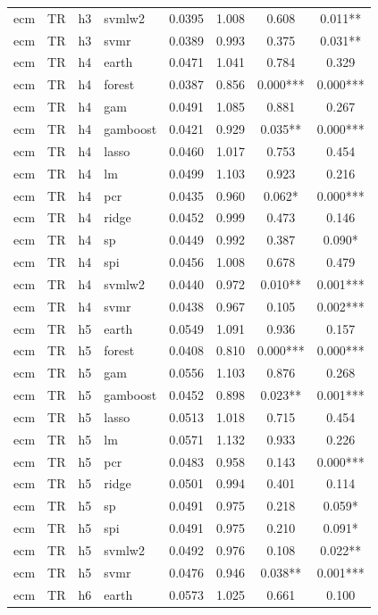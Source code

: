 \begin{ThreePartTable}
\begin{longtable}[t]{llclcccc}
ecm & TR & h3 & svmlw2 & 0.0395 & 1.008 & 0.608 & 0.011**\\
ecm & TR & h3 & svmr & 0.0389 & 0.993 & 0.375 & 0.031**\\
\addlinespace
ecm & TR & h4 & earth & 0.0471 & 1.041 & 0.784 & 0.329\\
ecm & TR & h4 & forest & 0.0387 & 0.856 & 0.000*** & 0.000***\\
ecm & TR & h4 & gam & 0.0491 & 1.085 & 0.881 & 0.267\\
ecm & TR & h4 & gamboost & 0.0421 & 0.929 & 0.035** & 0.000***\\
ecm & TR & h4 & lasso & 0.0460 & 1.017 & 0.753 & 0.454\\
ecm & TR & h4 & lm & 0.0499 & 1.103 & 0.923 & 0.216\\
ecm & TR & h4 & pcr & 0.0435 & 0.960 & 0.062* & 0.000***\\
ecm & TR & h4 & ridge & 0.0452 & 0.999 & 0.473 & 0.146\\
ecm & TR & h4 & sp & 0.0449 & 0.992 & 0.387 & 0.090*\\
ecm & TR & h4 & spi & 0.0456 & 1.008 & 0.678 & 0.479\\
ecm & TR & h4 & svmlw2 & 0.0440 & 0.972 & 0.010** & 0.001***\\
ecm & TR & h4 & svmr & 0.0438 & 0.967 & 0.105 & 0.002***\\
\addlinespace
ecm & TR & h5 & earth & 0.0549 & 1.091 & 0.936 & 0.157\\
ecm & TR & h5 & forest & 0.0408 & 0.810 & 0.000*** & 0.000***\\
ecm & TR & h5 & gam & 0.0556 & 1.103 & 0.876 & 0.268\\
ecm & TR & h5 & gamboost & 0.0452 & 0.898 & 0.023** & 0.001***\\
ecm & TR & h5 & lasso & 0.0513 & 1.018 & 0.715 & 0.454\\
ecm & TR & h5 & lm & 0.0571 & 1.132 & 0.933 & 0.226\\
ecm & TR & h5 & pcr & 0.0483 & 0.958 & 0.143 & 0.000***\\
ecm & TR & h5 & ridge & 0.0501 & 0.994 & 0.401 & 0.114\\
ecm & TR & h5 & sp & 0.0491 & 0.975 & 0.218 & 0.059*\\
ecm & TR & h5 & spi & 0.0491 & 0.975 & 0.210 & 0.091*\\
ecm & TR & h5 & svmlw2 & 0.0492 & 0.976 & 0.108 & 0.022**\\
ecm & TR & h5 & svmr & 0.0476 & 0.946 & 0.038** & 0.001***\\
\addlinespace
ecm & TR & h6 & earth & 0.0573 & 1.025 & 0.661 & 0.100\\

\end{longtable}
\end{ThreePartTable}

